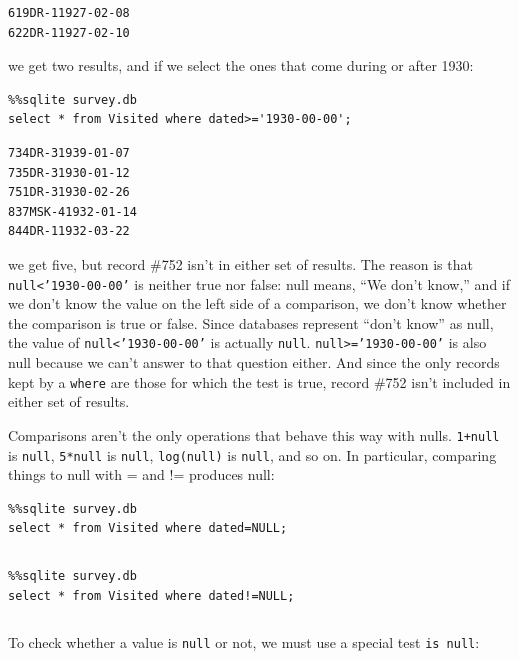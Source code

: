 \documentclass{book}
\begin{document}
\begin{verbatim}
619DR-11927-02-08
622DR-11927-02-10
\end{verbatim}

we get two results, and if we select the ones that come during or after
1930:

\begin{verbatim}
%%sqlite survey.db
select * from Visited where dated>='1930-00-00';
\end{verbatim}

\begin{verbatim}
734DR-31939-01-07
735DR-31930-01-12
751DR-31930-02-26
837MSK-41932-01-14
844DR-11932-03-22
\end{verbatim}

we get five, but record \#752 isn't in either set of results. The reason
is that \texttt{null\textless{}'1930-00-00'} is neither true nor false:
null means, ``We don't know,'' and if we don't know the value on the
left side of a comparison, we don't know whether the comparison is true
or false. Since databases represent ``don't know'' as null, the value of
\texttt{null\textless{}'1930-00-00'} is actually \texttt{null}.
\texttt{null\textgreater{}='1930-00-00'} is also null because we can't
answer to that question either. And since the only records kept by a
\texttt{where} are those for which the test is true, record \#752 isn't
included in either set of results.

Comparisons aren't the only operations that behave this way with nulls.
\texttt{1+null} is \texttt{null}, \texttt{5*null} is \texttt{null},
\texttt{log(null)} is \texttt{null}, and so on. In particular, comparing
things to null with = and != produces null:

\begin{verbatim}
%%sqlite survey.db
select * from Visited where dated=NULL;
\end{verbatim}

\begin{verbatim}
\end{verbatim}

\begin{verbatim}
%%sqlite survey.db
select * from Visited where dated!=NULL;
\end{verbatim}

\begin{verbatim}
\end{verbatim}

To check whether a value is \texttt{null} or not, we must use a special
test \texttt{is null}:
\end{document}
